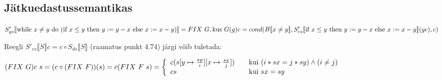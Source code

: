 \subsection{Jätkuedastussemantikas}

\footnotesize
\(
S'_{gs} \llbracket
\text{while\ } x \neq y \text{\ do\ }
  (\text{if\ } x \leq y
  \text{\ then\ } y := y - x \text{\ else\ } x := x - y )
\rrbracket
= FIX \ G,
\\
\text{kus} \ G(g) c = cond(B \llbracket x \neq y \rrbracket, 
S'_{cs} \llbracket \text{if\ } x \leq y \text{\ then\ } y := y - x
\text{\ else\ } x := x - y \rrbracket(g c),
c
)
\\
\)

Reegli \(S'_{cs} \llbracket S \rrbracket c = c \circ S_{ds} \llbracket S \rrbracket \) (raamatus punkt 4.74)
järgi võib tuletada:

\( \\
(FIX \ G) c \ s = (c \circ (FIX \ F))(s) = c( FIX \ F \ s) \\
\\
= \left \{ \begin{array}{l l}
  c ( s[y \mapsto \frac{sy}{i}][x \mapsto \frac{sx}{j} ]) & \quad \text{kui}\ (i * sx = j * sy) \wedge (i \neq j) \\
  c s & \quad \text{kui}\ sx = sy \\
\end{array} \right.
\\
\)

